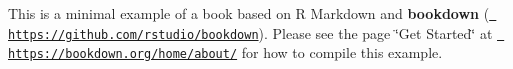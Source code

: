 This is a minimal example of a book based on R Markdown and {\bfseries{bookdown}} (\href{https://github.com/rstudio/bookdown}{\texttt{ https\+://github.\+com/rstudio/bookdown}}). Please see the page \char`\"{}\+Get Started\char`\"{} at \href{https://bookdown.org/home/about/}{\texttt{ https\+://bookdown.\+org/home/about/}} for how to compile this example. 